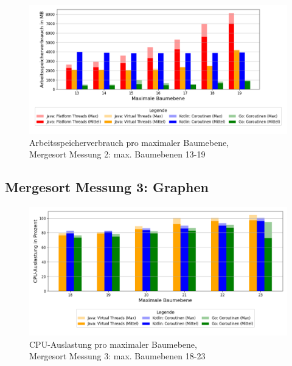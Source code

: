 \documentclass[fontsize=12pt,paper=a4,twoside=semi,parskip=half-,headsepline,headinclude]{scrreprt}
\begin{document}
\begin{figure}[H]
	\centering
	\includegraphics[scale=0.5]{figures/mergesort/Maximalebauebenen1-19_pvcg/memory_usage_bar_plot.png}
	\caption{Arbeitsspeicherverbrauch pro maximaler Baumebene,\\ Mergesort Messung 2: max. Baumebenen 13-19}
	\label{fig:ms1-19RAM}
\end{figure}

\subsection{Mergesort Messung 3: Graphen}

\begin{figure}[H]
	\centering
	\includegraphics[scale=0.5]{figures/mergesort/Maximalebauebenen1-23_vcg/cpu_usage_bar_plot.png}
	\caption{CPU-Auslastung pro maximaler Baumebene,\\ Mergesort Messung 3: max. Baumebenen 18-23}
	\label{fig:ms1-23CPU}
\end{figure}
\end{document}
